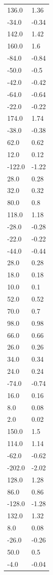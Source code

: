 \begin{longtable}{ll}
136.0 & 1.36 \\
-34.0 & -0.34 \\
142.0 & 1.42 \\
160.0 & 1.6 \\
-84.0 & -0.84 \\
-50.0 & -0.5 \\
-42.0 & -0.42 \\
-64.0 & -0.64 \\
-22.0 & -0.22 \\
174.0 & 1.74 \\
-38.0 & -0.38 \\
62.0 & 0.62 \\
12.0 & 0.12 \\
-122.0 & -1.22 \\
28.0 & 0.28 \\
32.0 & 0.32 \\
80.0 & 0.8 \\
118.0 & 1.18 \\
-28.0 & -0.28 \\
-22.0 & -0.22 \\
-44.0 & -0.44 \\
28.0 & 0.28 \\
18.0 & 0.18 \\
10.0 & 0.1 \\
52.0 & 0.52 \\
70.0 & 0.7 \\
98.0 & 0.98 \\
66.0 & 0.66 \\
26.0 & 0.26 \\
34.0 & 0.34 \\
24.0 & 0.24 \\
-74.0 & -0.74 \\
16.0 & 0.16 \\
8.0 & 0.08 \\
2.0 & 0.02 \\
150.0 & 1.5 \\
114.0 & 1.14 \\
-62.0 & -0.62 \\
-202.0 & -2.02 \\
128.0 & 1.28 \\
86.0 & 0.86 \\
-128.0 & -1.28 \\
132.0 & 1.32 \\
8.0 & 0.08 \\
-26.0 & -0.26 \\
50.0 & 0.5 \\
-4.0 & -0.04 \\

\end{longtable}
